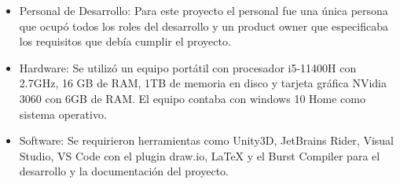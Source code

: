 \begin{itemize}
    \item Personal de Desarrollo: Para este proyecto el personal fue una única persona que ocupó todos los roles del desarrollo y un product owner que especificaba los requisitos que debía cumplir el proyecto.
    
    \item Hardware: Se utilizó un equipo portátil con procesador i5-11400H con 2.7GHz, 16 GB de RAM, 1TB de memoria en disco y tarjeta gráfica NVidia 3060 con 6GB de RAM. El equipo contaba con windows 10 Home como sistema operativo. 
    
    \item Software: Se requirieron herramientas como Unity3D, JetBrains Rider, Visual Studio, VS Code con el plugin draw.io, LaTeX y el Burst Compiler para el desarrollo y la documentación del proyecto.
\end{itemize}

